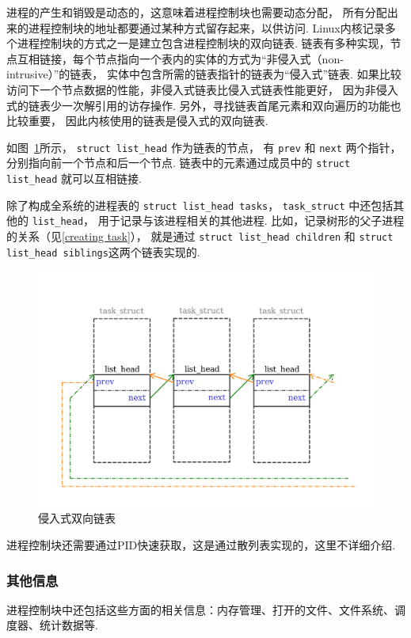 进程的产生和销毁是动态的，这意味着进程控制块也需要动态分配，
所有分配出来的进程控制块的地址都要通过某种方式留存起来，以供访问.
Linux内核记录多个进程控制块的方式之一是建立包含进程控制块的双向链表.
链表有多种实现，节点互相链接，每个节点指向一个表内的实体的方式为“非侵入式（non-intrusive）”的链表，
实体中包含所需的链表指针的链表为“侵入式”链表.
如果比较访问下一个节点数据的性能，非侵入式链表比侵入式链表性能更好，
因为非侵入式的链表少一次解引用的访存操作.
另外，寻找链表首尾元素和双向遍历的功能也比较重要，
因此内核使用的链表是侵入式的双向链表.

如图~\ref{fig:task_list}所示，
\lstinline{struct list_head} 作为链表的节点，
有 \lstinline{prev} 和 \lstinline{next} 两个指针，
分别指向前一个节点和后一个节点.
链表中的元素通过成员中的 \lstinline{struct list_head} 就可以互相链接.

除了构成全系统的进程表的 \lstinline{struct list_head tasks}，
\lstinline{task_struct} 中还包括其他的 \lstinline{list_head}，
用于记录与该进程相关的其他进程.
比如，记录树形的父子进程的关系（见\ref{creating task}），
就是通过 \lstinline{struct list_head children}
和 \lstinline{struct list_head siblings}这两个链表实现的.

\begin{figure}[]
	\centering
	\includegraphics[width=\textwidth]{img/intrusive_list.pdf}
	\caption{\label{fig:task_list} 侵入式双向链表}
\end{figure}

进程控制块还需要通过PID快速获取，这是通过散列表实现的，这里不详细介绍.

\subsubsection{其他信息}
进程控制块中还包括这些方面的相关信息：内存管理、打开的文件、文件系统、调度器、统计数据等.

